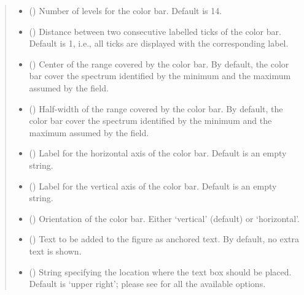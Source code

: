 \documentclass[letterpaper,10pt,english]{sphinxmanual}
\begin{document}
\begin{fulllineitems}
\begin{quote}
\begin{description}
\begin{itemize}
\item {} 
 () \textendash{} Number of levels for the color bar. Default is 14.

\item {} 
 () \textendash{} Distance between two consecutive labelled ticks of the color bar. Default is 1, i.e., all ticks are displayed with the
corresponding label.

\item {} 
 () \textendash{} Center of the range covered by the color bar. By default, the color bar cover the spectrum identified by the minimum
and the maximum assumed by the field.

\item {} 
 () \textendash{} Half-width of the range covered by the color bar. By default, the color bar cover the spectrum identified by the minimum
and the maximum assumed by the field.

\item {} 
 () \textendash{} Label for the horizontal axis of the color bar. Default is an empty string.

\item {} 
 () \textendash{} Label for the vertical axis of the color bar. Default is an empty string.

\item {} 
 () \textendash{} Orientation of the color bar. Either ‘vertical’ (default) or ‘horizontal’.

\item {} 
 () \textendash{} Text to be added to the figure as anchored text. By default, no extra text is shown.

\item {} 
 () \textendash{} String specifying the location where the text box should be placed. Default is ‘upper right’;
please see  for all the available options.

\end{itemize}

\end{description}\end{quote}

\end{fulllineitems}
\end{document}
